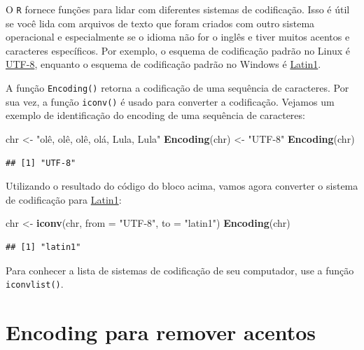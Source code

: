 \documentclass[]{book}
\newenvironment{Shaded}{\begin{snugshade}}{\end{snugshade}}
\newcommand{\DataTypeTok}[1]{\textcolor[rgb]{0.13,0.29,0.53}{#1}}
\newcommand{\KeywordTok}[1]{\textcolor[rgb]{0.13,0.29,0.53}{\textbf{#1}}}
\newcommand{\NormalTok}[1]{#1}
\newcommand{\StringTok}[1]{\textcolor[rgb]{0.31,0.60,0.02}{#1}}
\begin{document}
O \texttt{R} fornece funções para lidar com diferentes sistemas de codificação. Isso é útil se você lida com arquivos de texto que foram criados com outro sistema operacional e especialmente se o idioma não for o inglês e tiver muitos acentos e caracteres específicos. Por exemplo, o esquema de codificação padrão no Linux é \href{https://en.wikipedia.org/wiki/UTF-8}{UTF-8}, enquanto o esquema de codificação padrão no Windows é \href{https://en.wikipedia.org/wiki/Latin-1_Supplement_(Unicode_block)}{Latin1}.

A função \texttt{Encoding()} retorna a codificação de uma sequência de caracteres. Por sua vez, a função \texttt{iconv()} é usado para converter a codificação. Vejamos um exemplo de identificação do encoding de uma sequência de caracteres:

\begin{Shaded}
\begin{Highlighting}[]
\NormalTok{chr <-}\StringTok{ "olê, olê, olê, olá, Lula, Lula"}
\KeywordTok{Encoding}\NormalTok{(chr) <-}\StringTok{ "UTF-8"}
\KeywordTok{Encoding}\NormalTok{(chr)}
\end{Highlighting}
\end{Shaded}

\begin{verbatim}
## [1] "UTF-8"
\end{verbatim}

Utilizando o resultado do código do bloco acima, vamos agora converter o sistema de codificação para \href{https://en.wikipedia.org/wiki/Latin-1_Supplement_(Unicode_block)}{Latin1}:

\begin{Shaded}
\begin{Highlighting}[]
\NormalTok{chr <-}\StringTok{ }\KeywordTok{iconv}\NormalTok{(chr, }\DataTypeTok{from =} \StringTok{"UTF-8"}\NormalTok{, }\DataTypeTok{to =} \StringTok{"latin1"}\NormalTok{)}
\KeywordTok{Encoding}\NormalTok{(chr)}
\end{Highlighting}
\end{Shaded}

\begin{verbatim}
## [1] "latin1"
\end{verbatim}

Para conhecer a lista de sistemas de codificação de seu computador, use a função \texttt{iconvlist()}.

\hypertarget{encoding-para-remover-acentos}{%
\section{Encoding para remover acentos}\label{encoding-para-remover-acentos}}
\end{document}
